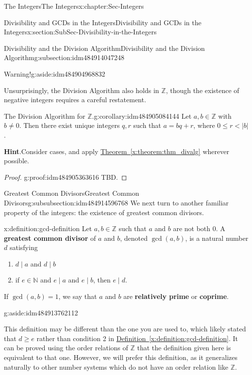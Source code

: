 \documentclass[oneside,10pt,]{book}
\newcommand{\blocktitlefont}{\relax}
\newcommand{\xreffont}{\relax}
\newcommand{\terminology}[1]{\textbf{#1}}
\numberwithin{equation}{section}
\renewcommand{\le}{\leqslant}
\renewcommand{\ge}{\geqslant}
\def\Z{{\mathbb Z}}
\def\N{{\mathbb N}}
\newcommand{\lt}{<}
\begin{document}
\begin{chapterptx}{The Integers}{}{The Integers}{}{}{x:chapter:Sec-Integers}
\begin{sectionptx}{Divisibility and GCDs in the Integers}{}{Divisibility and GCDs in the Integers}{}{}{x:section:SubSec-Divisibility-in-the-Integers}
\begin{subsectionptx}{Divisibility and the Division Algorithm}{}{Divisibility and the Division Algorithm}{}{}{g:subsection:idm484914047248}
\begin{aside}{Warning!}{g:aside:idm484904968832}
\end{aside}
Unsurprisingly, the Division Algorithm also holds in \(\Z\), though the existence of negative integers requires a careful restatement. %
\begin{corollary}{The Division Algorithm for \(\Z\).}{}{g:corollary:idm484905084144}%
\index{Division Algorithm (\(\Z\))}%
Let \(a,b\in \Z\) with \(b\ne 0\). Then there exist unique integers \(q,r\) such that \(a = bq + r\), where \(0 \le r \lt |b|\).%

\textbf{\blocktitlefont Hint}.\quad{}Consider cases, and apply \hyperref[x:theorem:thm_divalg]{Theorem~{\xreffont\ref{x:theorem:thm_divalg}}} wherever possible.%
\end{corollary}
\begin{proof}{}{g:proof:idm484905363616}
TBD.%
\end{proof}
\end{subsectionptx}
%
%
\typeout{************************************************}
\typeout{************************************************}
%
\begin{subsubsectionptx}{Greatest Common Divisors}{}{Greatest Common Divisors}{}{}{g:subsubsection:idm484914596768}
We next turn to another familiar property of the integers: the existence of greatest common divisors.%
\begin{definition}{}{x:definition:gcd-definition}%
\index{greatest common divisor (\(\Z\))}%
Let \(a,b\in \Z\) such that \(a\) and \(b\) are not both 0. A \terminology{greatest common divisor} of \(a\) and \(b\), denoted \(\gcd(a,b)\), is a natural number \(d\) satisfying%
\begin{enumerate}
\item{}\(d\mid a\) and \(d\mid b\)%
\item{}if \(e\in \N\) and \(e\mid a\) and \(e\mid b\), then \(e\mid d\).%
\end{enumerate}
%
\par
If \(\gcd(a,b) = 1\), we say that \(a\) and \(b\) are \terminology{relatively prime} or \terminology{coprime}. \begin{aside}{}{g:aside:idm484913762112}%
\end{aside}
%
\end{definition}
This definition may be different than the one you are used to, which likely stated that \(d \ge e\) rather than condition 2 in \hyperref[x:definition:gcd-definition]{Definition~{\xreffont\ref{x:definition:gcd-definition}}}. It can be proved using the order relations of \(\Z\) that the definition given here is equivalent to that one. However, we will prefer this definition, as it generalizes naturally to other number systems which do not have an order relation like \(\Z\).%

\end{subsubsectionptx}
\end{sectionptx}
\end{chapterptx}
\end{document}
